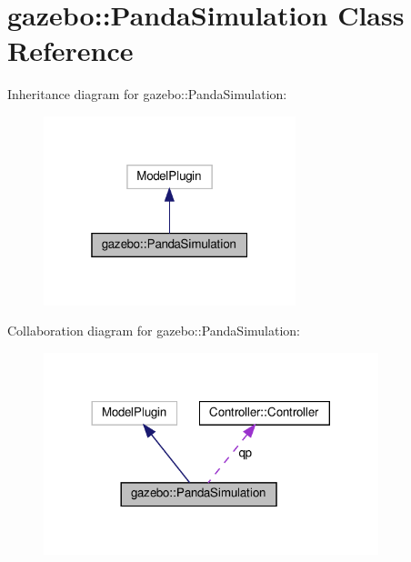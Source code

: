 \hypertarget{classgazebo_1_1_panda_simulation}{}\section{gazebo\+:\+:Panda\+Simulation Class Reference}
\label{classgazebo_1_1_panda_simulation}


Inheritance diagram for gazebo\+:\+:Panda\+Simulation\+:\nopagebreak
\begin{figure}[H]
\begin{center}
\leavevmode
\includegraphics[width=208pt]{classgazebo_1_1_panda_simulation__inherit__graph}
\end{center}
\end{figure}


Collaboration diagram for gazebo\+:\+:Panda\+Simulation\+:\nopagebreak
\begin{figure}[H]
\begin{center}
\leavevmode
\includegraphics[width=276pt]{classgazebo_1_1_panda_simulation__coll__graph}
\end{center}
\end{figure}
